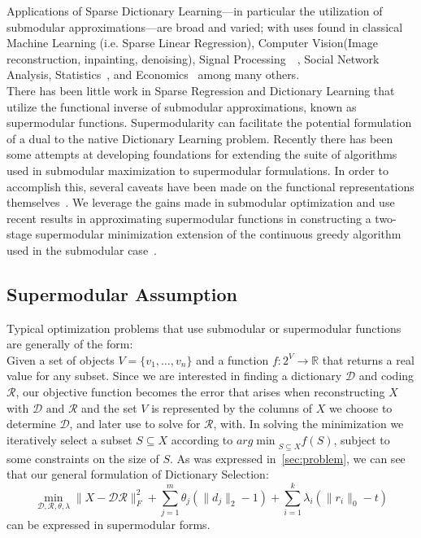 \documentclass{article}
\newcommand{\R}{\mathbb{R}}
\newcommand{\Rr}{\mathcal{R}}
\newcommand{\D}{\mathcal{D}}
\begin{document}
\noindent Applications of Sparse Dictionary Learning---in particular the utilization of submodular approximations---are broad and varied; with uses found in classical Machine Learning (i.e. Sparse Linear Regression), Computer Vision(Image reconstruction, inpainting, denoising), Signal Processing~\cite{submod_sparsecoding}~\cite{nonconvexrelax}, Social Network Analysis, Statistics~\cite{rIBP}, and Economics~\cite{utilityWelfare} among many others. 
\\

\noindent There has been little work in Sparse Regression and Dictionary Learning that utilize the functional inverse of submodular approximations, known as supermodular functions. Supermodularity can facilitate the potential formulation of a dual to the native Dictionary Learning problem. Recently there has been some attempts at developing foundations for extending the suite of algorithms used in submodular maximization to supermodular formulations. In order to accomplish this, several caveats have been made on the functional representations themselves~\cite{weaklyalpha}. We leverage the gains made in submodular optimization and use recent results in approximating supermodular functions in constructing a two-stage supermodular minimization extension of the continuous greedy algorithm used in the submodular case~\cite{Singer16TwoStage}.

\subsection{Supermodular Assumption}\label{sec:supermod}

\noindent Typical optimization problems that use submodular or supermodular functions are generally of the form:\\

\noindent Given a set of objects $V=\{v_1,\ldots,v_n\}$ and a function $f:2^V\to \R$ that returns a real value for any subset. Since we are interested in finding a dictionary $\D$ and coding $\Rr$, our objective function becomes the error that arises when reconstructing $X$ with $\D \text{ and } \Rr$ and the set $V$ is represented by the columns of $X$ we choose to determine $\D$, and later use to solve for $\Rr$, with. In solving the minimization we iteratively select a subset $S\subseteq X$ according to ${arg\min}_{S\subseteq X} f(S)$,  subject to some constraints on the size of $S$. As was expressed in~\ref{sec:problem}, we can see that our general formulation of Dictionary Selection:  
$$\min_{\D, \Rr, \theta, \lambda} \|X  -\D\Rr\|_F^2 + \sum_{j=1}^m \theta_j (\| d_j\|_2 - 1)+ \sum_{i=1}^k \lambda_i (\| r_i \|_0 - t)$$
can be expressed in supermodular forms.\\
\end{document}
